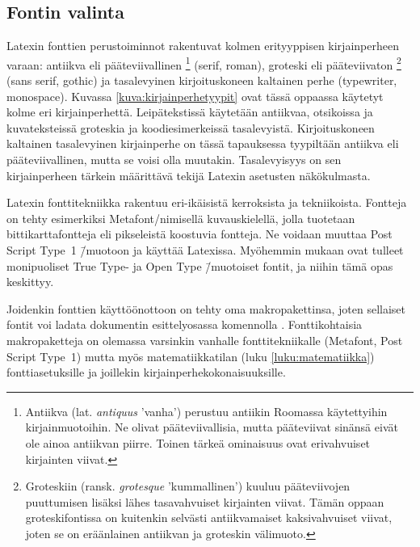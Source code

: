 \subsection{Fontin valinta}

Latexin fonttien perus\-toiminnot rakentuvat kolmen erityyppisen
kirjainperheen varaan: antiikva eli pääteviivallinen%
\footnote{Antiikva (lat. \emph{antiquus} 'vanha') perustuu antiikin
  Roomassa käytettyihin kirjainmuotoihin. Ne olivat pääteviivallisia,
  mutta pääteviivat sinänsä eivät ole ainoa antiikvan piirre. Toinen
  tärkeä ominaisuus ovat erivahvuiset kirjainten viivat.}
(\textenglish{serif, roman}), groteski eli pääteviivaton%
\footnote{Groteskiin (ransk. \emph{grotesque} 'kummallinen') kuuluu
  pääteviivojen puuttumisen lisäksi lähes tasavahvuiset kirjainten
  viivat. Tämän oppaan groteskifontissa on kuitenkin selvästi
  antiikvamaiset kaksivahvuiset viivat, joten se on eräänlainen
  antiikvan ja groteskin välimuoto.} (\textenglish{sans serif, gothic})
ja tasalevyinen kirjoituskoneen kaltainen perhe
(\textenglish{typewriter, monospace}). Kuvassa
\ref{kuva:kirjainperhetyypit} ovat tässä oppaassa käytetyt kolme eri
kirjainperhettä. Leipätekstissä käytetään antiikvaa, otsikoissa ja
kuvateksteissä groteskia ja koodi\-esi\-mer\-keis\-sä tasalevyistä.
Kirjoituskoneen kaltainen tasalevyinen kirjainperhe on tässä tapauksessa
tyypiltään antiikva eli pääteviivallinen, mutta se voisi olla muutakin.
Tasalevyisyys on sen kirjainperheen tärkein määrittävä tekijä Latexin
asetusten näkökulmasta.


Latexin fonttitekniikka rakentuu eri-ikäisistä kerroksista ja
tekniikoista. Fontteja on tehty esimerkiksi Metafont\-/nimisellä
kuvauskielellä, jolla tuotetaan bittikarttafontteja eli pikseleistä
koostuvia fontteja. Ne voidaan muuttaa Post Script Type~1 \=/muotoon ja
käyttää Latexissa. Myöhemmin mukaan ovat tulleet monipuoliset True Type-
ja Open Type \=/muotoiset fontit, ja niihin tämä opas keskittyy.

Joidenkin fonttien käyttöönottoon on tehty oma makropakettinsa, joten
sellaiset fontit voi ladata dokumentin esittelyosassa komennolla
. Fonttikohtaisia makropaketteja on olemassa
varsinkin vanhalle fonttitekniikalle (Metafont, Post Script Type~1)
mutta myös matematiikkatilan (luku \ref{luku:matematiikka})
fonttiasetuksille ja joillekin kir\-jain\-perhe\-koko\-nai\-suuk\-sille.

